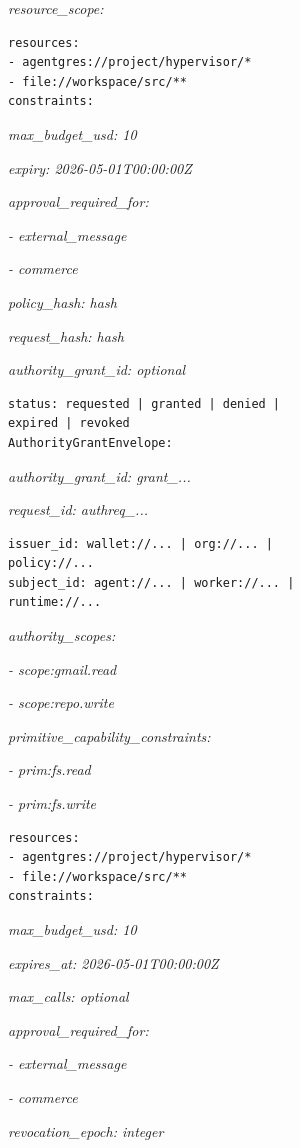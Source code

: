\documentclass[
  11pt,
]{article}
\begin{document}
\emph{resource\_scope:}

\begin{lstlisting}[language=rustioi]
resources:
- agentgres://project/hypervisor/*
- file://workspace/src/**
constraints:
\end{lstlisting}
\emph{max\_budget\_usd: 10}

\emph{expiry: 2026-05-01T00:00:00Z}

\emph{approval\_required\_for:}

\emph{- external\_message}

\emph{- commerce}

\emph{policy\_hash: hash}

\emph{request\_hash: hash}

\emph{authority\_grant\_id: optional}

\begin{lstlisting}[language={},basicstyle=\ttfamily\scriptsize]
status: requested | granted | denied |
expired | revoked
AuthorityGrantEnvelope:
\end{lstlisting}
\emph{authority\_grant\_id: grant\_...}

\emph{request\_id: authreq\_...}

\begin{lstlisting}[language={},basicstyle=\ttfamily\scriptsize]
issuer_id: wallet://... | org://... |
policy://...
subject_id: agent://... | worker://... |
runtime://...
\end{lstlisting}
\emph{authority\_scopes:}

\emph{- scope:gmail.read}

\emph{- scope:repo.write}

\emph{primitive\_capability\_constraints:}

\emph{- prim:fs.read}

\emph{- prim:fs.write}

\begin{lstlisting}[language=rustioi]
resources:
- agentgres://project/hypervisor/*
- file://workspace/src/**
constraints:
\end{lstlisting}
\emph{max\_budget\_usd: 10}

\emph{expires\_at: 2026-05-01T00:00:00Z}

\emph{max\_calls: optional}

\emph{approval\_required\_for:}

\emph{- external\_message}

\emph{- commerce}

\emph{revocation\_epoch: integer}
\end{document}
